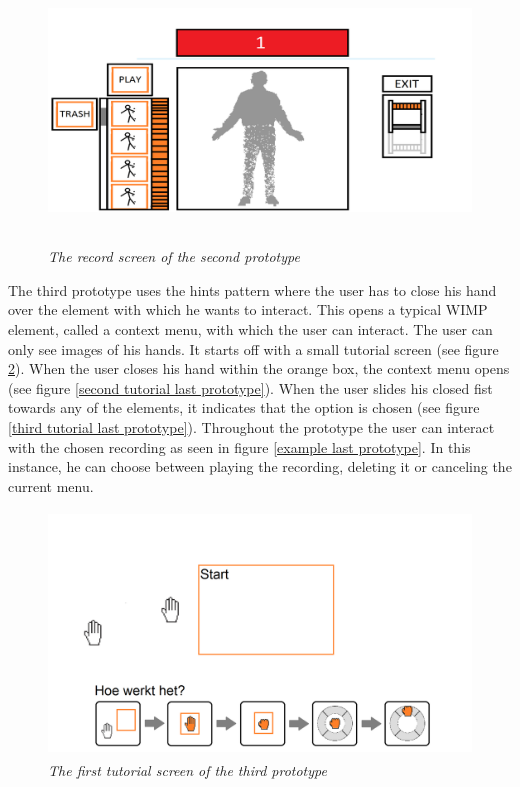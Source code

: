 \begin{figure}[H]
	\begin{center}
		\includegraphics[width=12.5cm, height=7cm]{figures/prototype_6_3_record.png}
		\caption{\emph{The record screen of the second prototype}}
		\label{record third prototype}
	\end{center}
\end{figure}

The third prototype uses the hints pattern where the user has to close his hand over the element with which he wants to interact. This opens a typical WIMP element, called a context menu, with which the user can interact. The user can only see images of his hands. It starts off with a small tutorial screen (see figure \ref{first tutorial last prototype}). When the user closes his hand within the orange box, the context menu opens (see figure \ref{second tutorial last prototype}). When the user slides his closed fist towards any of the elements, it indicates that the option is chosen (see figure \ref{third tutorial last prototype}). Throughout the prototype the user can interact with the chosen recording as seen in figure \ref{example last prototype}. In this instance, he can choose between playing the recording, deleting it or canceling the current menu.\\

\begin{figure}[H]
	\begin{center}
		\includegraphics[width=12cm, height=6.5cm]{figures/prototype_7_6_tutorial_1.png}
		\caption{\emph{The first tutorial screen of the third prototype}}
		\label{first tutorial last prototype}
	\end{center}
\end{figure}

